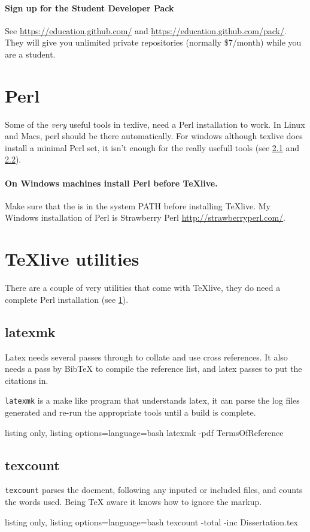 \paragraph{Sign up for the Student Developer Pack} See \url{https://education.github.com/} and \url{https://education.github.com/pack/}.  They will give you unlimited private repositories (normally \$7/month) while you are a student.

\section{Perl}\label{perl}
Some of the \emph{very} useful tools in texlive, need a Perl installation to work.   In Linux and Macs, perl should be there automatically.  For windows although texlive does install a minimal Perl set, it isn't enough for the really usefull tools (see \ref{latexmk} and \ref{texcount}).

\paragraph{On Windows machines install Perl before TeXlive.}
Make sure that the  is in the system PATH before installing TeXlive.   My Windows installation of Perl is Strawberry Perl \url{http://strawberryperl.com/}.


\section{TeXlive utilities}
There are a couple of very utilities that come with TeXlive, they do need a complete Perl installation (see \ref{perl}).

\subsection{latexmk}\label{latexmk}
Latex needs several passes through to collate and use cross references.  It also needs a pass by BibTeX to compile the reference list, and latex passes to put the citations in.

\texttt{latexmk} is a make like program that understands latex, it can parse the log files generated and re-run the appropriate tools until a build is complete.
\begin{tcblisting}{listing only, listing options={language=bash}}
    latexmk -pdf TermsOfReference
\end{tcblisting}

\subsection{texcount}\label{texcount}
\texttt{texcount} parses the docment, following any inputed or included files, and counts the words used.  Being TeX aware it knows how to ignore the markup.
\begin{tcblisting}{listing only, listing options={language=bash}}
    texcount -total -inc Dissertation.tex
\end{tcblisting}

